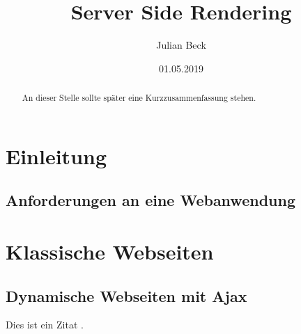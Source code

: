 \documentclass[runningheads]{llncs}
\title{Server Side Rendering}
\author{Julian Beck}
\institute{Betreuer: Prof. Dr. rer. nat. Christian Zirpins}
\date{01.05.2019}
\begin{document}
\let\oldaddcontentsline\addcontentsline
\def\addcontentsline#1#2#3{}
\maketitle
\def\addcontentsline#1#2#3{\oldaddcontentsline{#1}{#2}{#3}}


\begin{abstract}
  An dieser Stelle sollte später eine Kurzzusammenfassung stehen.
\end{abstract}

\tableofcontents 
\newpage

\section{Einleitung}
\label{sec:Einleitung}


\subsection{Anforderungen an eine Webanwendung}
\label{subsec:Anforderungen an eine Webanwendung}


\section{Klassische Webseiten}
\label{sec:Klassische Webseiten}


\subsection{Dynamische Webseiten mit Ajax}
\label{subsec:Dynamische Webseiten mit Ajax}



Dies ist ein Zitat \cite{becker2008a}.

\end{document}
